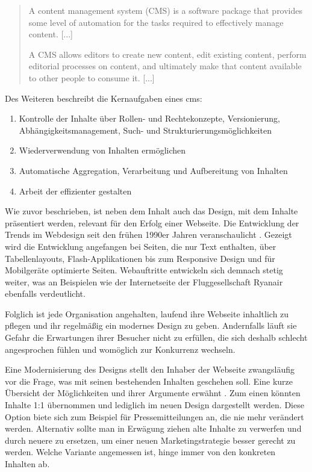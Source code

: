         \begin{quote}
            A content management system (CMS) is a software package that provides
            some level of automation for the tasks required to effectively manage content.
            [...]

            A CMS allows editors to create new content, edit existing content,
            perform editorial processes on content, and ultimately make that content
            available to other people to consume it.
            [...]
        \end{quote}

        Des Weiteren beschreibt \cite[][Seite 9-12]{barker:webCMS} die Kernaufgaben eines \gls{cms}:
        \begin{enumerate}
            \item   Kontrolle der Inhalte über Rollen- und Rechtekonzepte,
                    Versionierung, Abhängigkeitsmanagement, Such- und Strukturierungsmöglichkeiten
            \item   Wiederverwendung von Inhalten ermöglichen
            \item   Automatische Aggregation, Verarbeitung und Aufbereitung von Inhalten
            \item   Arbeit der {\editors} effizienter gestalten
        \end{enumerate}

        Wie zuvor beschrieben, ist neben dem Inhalt auch das Design,
        mit dem Inhalte präsentiert werden, relevant für den Erfolg einer Webseite.
        Die Entwicklung der Trends im Webdesign seit den frühen 1990er Jahren veranschaulicht
        \cite{work:webDesignEvolution}.
        Gezeigt wird die Entwicklung angefangen bei Seiten, die nur Text enthalten,
        über Tabellenlayouts, Flash-Applikationen bis zum Responsive Design und für
        Mobilgeräte optimierte Seiten.
        Webauftritte entwickeln sich demnach stetig weiter,
        was \cite{murphy:webDesignEvolution} an Beispielen wie der Internetseite der
        Fluggesellschaft Ryanair ebenfalls verdeutlicht.

        Folglich ist jede Organisation angehalten, laufend ihre Webseite inhaltlich zu pflegen
        und ihr regelmäßig ein modernes Design zu geben.
        Andernfalls läuft sie Gefahr die Erwartungen ihrer Besucher nicht zu erfüllen,
        die sich deshalb schlecht angesprochen fühlen und womöglich zur Konkurrenz wechseln.

        Eine Modernisierung des Designs stellt den Inhaber der Webseite zwangsläufig vor die Frage,
        was mit seinen bestehenden Inhalten geschehen soll.
        Eine kurze Übersicht der Möglichkeiten und ihrer Argumente erwähnt \cite{kahl:contentMigration}.
        Zum einen könnten Inhalte 1:1 übernommen und lediglich im neuen Design dargestellt werden.
        Diese Option biete sich zum Beispiel für Pressemitteilungen an, die nie mehr verändert werden.
        Alternativ sollte man in Erwägung ziehen alte Inhalte zu verwerfen und durch neuere
        zu ersetzen, um einer neuen Marketingstrategie besser gerecht zu werden.
        Welche Variante angemessen ist, hinge immer von den konkreten Inhalten ab.

